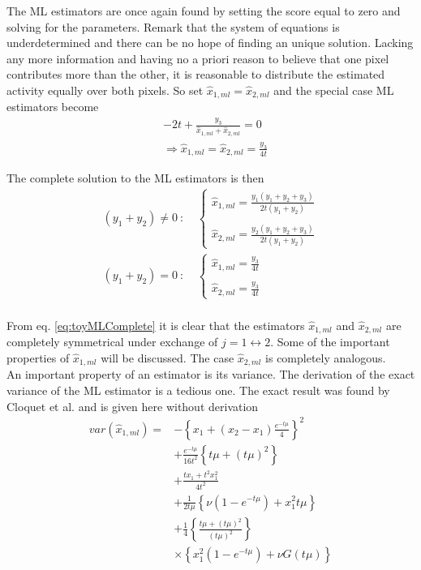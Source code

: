 \documentclass[report,12pt]{report}
\begin{document}
The ML estimators are once again found by setting the score equal to zero and solving for the parameters. Remark that the system of equations is underdetermined and there can be no hope of finding an unique solution. Lacking any more information and having no a priori reason to believe that one pixel contributes more than the other, it is reasonable to distribute the estimated activity equally over both pixels. So set $\hat x_{1, ml} = \hat x_{2, ml}$ and the special case ML estimators become
\begin{align}
	&- 2t + \frac{y_3}{\hat x_{1, ml} + \hat x_{2, ml}} = 0
	\nonumber\\
	&\Rightarrow \hat x_{1, ml} = \hat x_{2, ml} = \frac{y_3}{4t}
\end{align}

The complete solution to the ML estimators is then
\begin{align}
	(y_1 + y_2) \neq 0\ : \
	&\left\{\begin{array}{cc} 
	\hat x_{1, ml} = \frac{y_1(y_1 + y_2 + y_3)}{2t(y_1 + y_2)}\\ 
	\nonumber\\
	\hat x_{2, ml} = \frac{y_2(y_1 + y_2 + y_3)}{2t(y_1 + y_{2})}   
	\end{array}\right.
	\nonumber\\
	(y_1 + y_2) = 0\ : \
	&\left\{\begin{array}{cc} 
	\hat x_{1, ml} = \frac{y_3}{4t}\\ 
	\nonumber\\
	\hat x_{2, ml} = \frac{y_3}{4t}   
	\end{array}\right.
	\\
	\label{eq:toyMLComplete}
\end{align}

From eq. \ref{eq:toyMLComplete} it is clear that the estimators $\hat x_{1, ml}$ and $\hat x_{2, ml}$ are completely symmetrical under exchange of $j=1 \leftrightarrow 2$. Some of the important properties of $\hat x_{1,ml}$ will be discussed. The case $\hat x_{2,ml}$ is completely analogous.\\

An important property of an estimator is its variance. The derivation of the exact variance of the ML estimator is a tedious one. The exact result was found by Cloquet et al. \cite{MLEM and OSEM Deviate} and is given here without derivation
\begin{align}
	var(\hat x_{1,ml}) = &-\left\{ x_1 + (x_2 - x_1) \frac{e^{-t \mu}}{4} \right\} ^2\nonumber\\
			&+\frac{e^{-t \mu}}{16 t^2} \left\{ t \mu + (t \mu)^2 \right\}\nonumber\\
			&+\frac{t x_1 + t^2x_1^2}{4t^2}\nonumber\\
			&+\frac{1}{2t \mu} \left\{ \nu(1-e^{-t \mu}) + x_1^2 t \mu \right\}\nonumber\\
			&+\frac{1}{4} \left\{ \frac{t \mu + (t \mu)^2}{(t \mu)^2} \right\}\nonumber\\
			&\times \left\{ x_1^2 (1-e^{-t \mu}) + \nu G (t \mu) \right\}
	\label{eq:varML}
\end{align}
\end{document}

